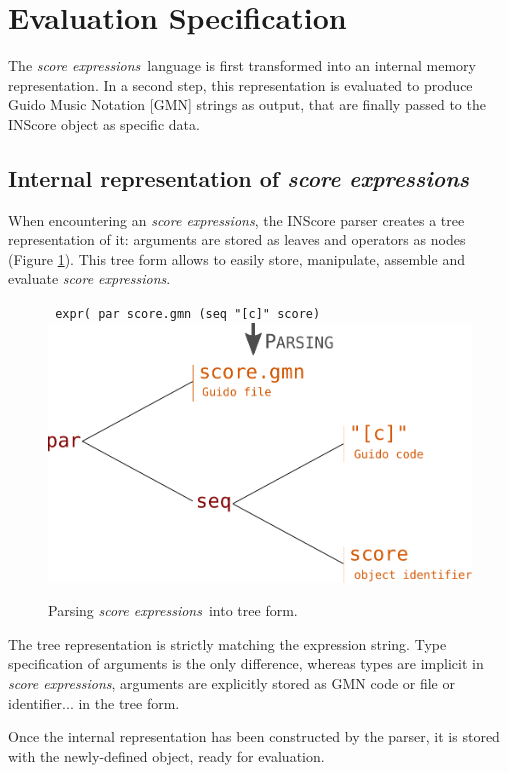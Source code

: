 \documentclass{article}
\newcommand{\OSC}[1]{\texttt{#1}}
\newcommand{\oper}[1]{\textcolor{figRed}{#1}}
\newcommand{\param}[1]{\textcolor{figOrange}{#1}}
\newcommand{\sExpr}{\emph{score expressions}}
\begin{document}
\section{Evaluation Specification}
\label{evaluationSpec}
The \sExpr\ language is first transformed into an internal memory representation. In a second step, this representation is evaluated to produce Guido Music Notation [GMN] \cite{hoos98} strings as output, that are finally passed to the INScore object as specific data.

\subsection{Internal representation of \sExpr}

When encountering an \sExpr, the INScore parser creates a tree representation of it: arguments are stored as leaves and operators as nodes (Figure \ref{fig:parsing}). This tree form allows to easily  store, manipulate, assemble and evaluate \sExpr.

\begin{figure}[th]
\centering
\OSC{ expr( \oper{par} \param{score.gmn}  (\oper{seq} \param{"[c]" score})}
\includegraphics[width=0.8\columnwidth]{imgs/exprParse}
\caption{Parsing \sExpr\ into tree form.
\label{fig:parsing}}
\end{figure}

The tree representation is strictly matching the expression string. Type specification of arguments is the only difference, whereas types are implicit in \sExpr, arguments are explicitly stored as GMN code or file or identifier... in the tree form. 

Once the internal representation has been constructed by the parser, it is stored with the newly-defined object, ready for evaluation.
\end{document}
